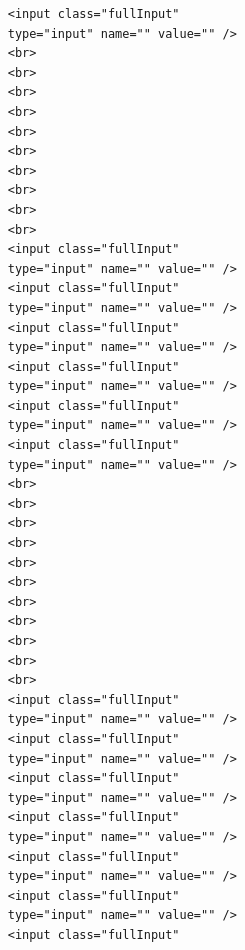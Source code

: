 \documentclass[12pt]{report} %
\begin{document}
\begin{verbatim}
                                    <input class="fullInput"
                                    type="input" name="" value="" />
                                    <br>
                                    <br>
                                    <br>
                                    <br>
                                    <br>
                                    <br>
                                    <br>
                                    <br>
                                    <br>
                                    <br>
                                    <input class="fullInput"
                                    type="input" name="" value="" />
                                    <input class="fullInput"
                                    type="input" name="" value="" />
                                    <input class="fullInput"
                                    type="input" name="" value="" />
                                    <input class="fullInput"
                                    type="input" name="" value="" />
                                    <input class="fullInput"
                                    type="input" name="" value="" />
                                    <input class="fullInput"
                                    type="input" name="" value="" />
                                    <br>
                                    <br>
                                    <br>
                                    <br>
                                    <br>
                                    <br>
                                    <br>
                                    <br>
                                    <br>
                                    <br>
                                    <br>
                                    <input class="fullInput"
                                    type="input" name="" value="" />
                                    <input class="fullInput"
                                    type="input" name="" value="" />
                                    <input class="fullInput"
                                    type="input" name="" value="" />
                                    <input class="fullInput"
                                    type="input" name="" value="" />
                                    <input class="fullInput"
                                    type="input" name="" value="" />
                                    <input class="fullInput"
                                    type="input" name="" value="" />
                                    <input class="fullInput"

\end{verbatim}
\end{document}
